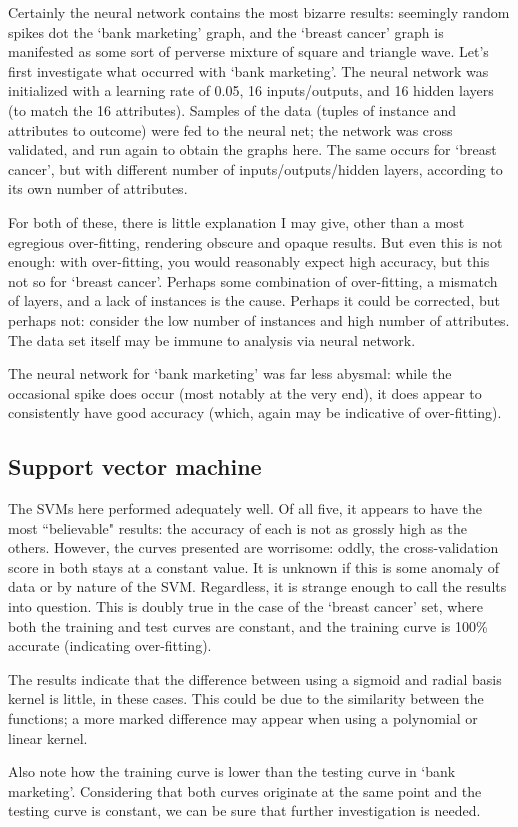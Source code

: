 Certainly the neural network contains the most bizarre results: seemingly random spikes dot the `bank marketing' graph, and the `breast cancer' graph is manifested as some sort of perverse mixture of square and triangle wave. Let's first investigate what occurred with `bank marketing'. The neural network was initialized with a learning rate of 0.05, 16 inputs/outputs, and 16 hidden layers (to match the 16 attributes). Samples of the data (tuples of instance and attributes to outcome) were fed to the neural net; the network was cross validated, and run again to obtain the graphs here. The same occurs for `breast cancer', but with different number of inputs/outputs/hidden layers, according to its own number of attributes.

For both of these, there is little explanation I may give, other than a most egregious over-fitting, rendering obscure and opaque results. But even this is not enough: with over-fitting, you would reasonably expect high accuracy, but this not so for `breast cancer'. Perhaps some combination of over-fitting, a mismatch of layers, and a lack of instances is the cause. Perhaps it could be corrected, but perhaps not: consider the low number of instances and high number of attributes. The data set itself may be immune to analysis via neural network.

The neural network for `bank marketing' was far less abysmal: while the occasional spike does occur (most notably at the very end), it does appear to consistently have good accuracy (which, again may be indicative of over-fitting).

\subsection{Support vector machine}

The SVMs here performed adequately well. Of all five, it appears to have the most ``believable" results: the accuracy of each is not as grossly high as the others. However, the curves presented are worrisome: oddly, the cross-validation score in both stays at a constant value. It is unknown if this is some anomaly of data or by nature of the SVM. Regardless, it is strange enough to call the results into question. This is doubly true in the case of the `breast cancer' set, where both the training and test curves are constant, and the training curve is 100\% accurate (indicating over-fitting).

The results indicate that the difference between using a sigmoid and radial basis kernel is little, in these cases. This could be due to the similarity between the functions; a more marked difference may appear when using a polynomial or linear kernel.

Also note how the training curve is lower than the testing curve in `bank marketing'. Considering that both curves originate at the same point and the testing curve is constant, we can be sure that further investigation is needed.
